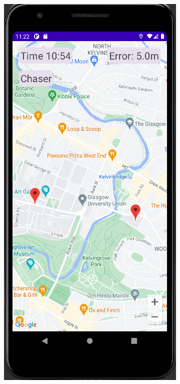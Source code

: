 \documentclass{l4proj}
\begin{document}
\begin{figure}
    \label{fig:ui_imp}
    \centering
    \begin{subfigure}[b]{0.25\textwidth}
        \includegraphics[width=\textwidth]{images/ui_chaser.png}

\end{subfigure}
\end{figure}
\end{document}
